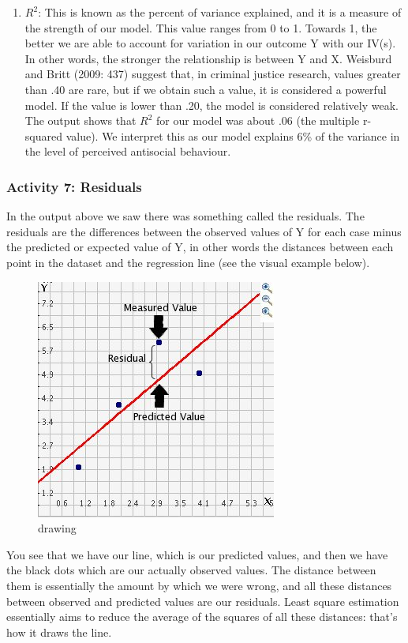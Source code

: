 \documentclass[
]{book}
\begin{document}
\begin{enumerate}
\item
  \(R^2\): This is known as the percent of variance explained, and it is a measure of the strength of our model. This value ranges from 0 to 1. Towards 1, the better we are able to account for variation in our outcome Y with our IV(s). In other words, the stronger the relationship is between Y and X. Weisburd and Britt (2009: 437) suggest that, in criminal justice research, values greater than .40 are rare, but if we obtain such a value, it is considered a powerful model. If the value is lower than .20, the model is considered relatively weak. The output shows that \(R^2\) for our model was about .06 (the multiple r-squared value). We interpret this as our model explains 6\% of the variance in the level of perceived antisocial behaviour.
\end{enumerate}

\hypertarget{activity-7-residuals}{%
\subsubsection{Activity 7: Residuals}\label{activity-7-residuals}}

In the output above we saw there was something called the residuals. The residuals are the differences between the observed values of Y for each case minus the predicted or expected value of Y, in other words the distances between each point in the dataset and the regression line (see the visual example below).

\begin{figure}
\centering
\includegraphics{Images/residual.jpg}
\caption{drawing}
\end{figure}

You see that we have our line, which is our predicted values, and then we have the black dots which are our actually observed values. The distance between them is essentially the amount by which we were wrong, and all these distances between observed and predicted values are our residuals. Least square estimation essentially aims to reduce the average of the squares of all these distances: that's how it draws the line.
\end{document}
